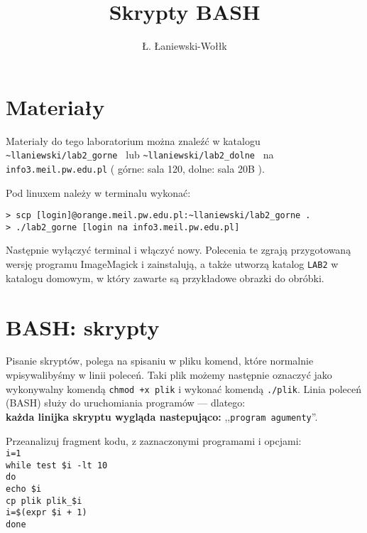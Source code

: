 \documentclass[polish]{instrukcja}
\title{Skrypty BASH}
\author{Ł. Łaniewski-Wołłk}
\begin{document}
\maketitle

\section{Materiały}

Materiały do tego laboratorium można znaleźć w katalogu {\tt \textasciitilde{}llaniewski/lab2\_gorne } lub  {\tt \textasciitilde{}llaniewski/lab2\_dolne }  na {\tt info3.meil.pw.edu.pl} ( górne: sala 120, dolne: sala 20B ). 

Pod linuxem należy w terminalu wykonać:
\begin{verbatim}
> scp [login]@orange.meil.pw.edu.pl:~llaniewski/lab2_gorne .
> ./lab2_gorne [login na info3.meil.pw.edu.pl]
\end{verbatim}
Następnie wyłączyć terminal i włączyć nowy. Polecenia te zgrają przygotowaną wersję programu ImageMagick i zainstalują, a także utworzą katalog {\tt LAB2} w katalogu domowym, w który zawarte są przykładowe obrazki do obróbki.

\section{BASH: skrypty}
Pisanie skryptów, polega na spisaniu w pliku komend, które normalnie wpisywalibyśmy w linii poleceń. Taki plik możemy następnie oznaczyć jako wykonywalny komendą {\tt chmod +x plik} i wykonać komendą {\tt ./plik}. Linia poleceń (BASH) służy do uruchomiania programów --- dlatego:\\{\bf każda linijka skryptu wygląda nastepująco:} ,,{\tt {\red program} {\green agumenty}}''.

Przeanalizuj fragment kodu, z zaznaczonymi {\red programami} i {\green opcjami}:
{\tt\\
{\red i=1}\\
while {\red test} {\green \$i -lt 10}\\
do\\
{\red echo} {\green \$i}\\
{\red cp} {\green plik plik\_\$i}\\
{\red i=}\$({\red expr} {\green \$i + 1})\\
done\\
}
\end{document}
